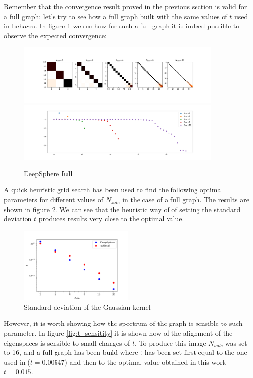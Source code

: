 Remember that the convergence result proved in the previous section is valid for a full graph: let's try to see how a full graph built with the same values of $t$ used in \cite{DeepSphere} behaves. 
In figure \ref{fig:DeepSphere_full} we see how for such a full graph it is indeed possible to observe the expected convergence:
\begin{figure}[h]
	\label{fig:DeepSphere_full}
	\caption{DeepSphere \textbf{full}}
	\centering
	\includegraphics[width=0.9\textwidth]{../codes/06_figures/deepsphere_full.png}
	\includegraphics[width=0.9\textwidth]{../codes/06_figures/deepsphere_full_diagonal.png}	
\end{figure}
A quick heuristic grid search has been used to find the following optimal parameters for different values of $N_{side}$ in the case of a full graph. The results are shown in figure \ref{fig:t}. We can see that the heuristic way of \cite{DeepSphere} of setting the standard deviation $t$ produces results very close to the optimal value.

\begin{figure}[h]
	\label{fig:t}
	\caption{Standard deviation of the Gaussian kernel}
	\centering
	\includegraphics[width=0.5\textwidth]{../codes/06_figures/kernelwidth.png}
\end{figure}

However, it is worth showing how the spectrum of the graph is sensible to such parameter. In figure \ref{fig:t_sensitity} it is shown how of the alignment of the eigenspaces is sensible to small changes of $t$. To produce this image $N_{side}$ was set to 16, and a full graph has been build where $t$ has been set first equal to the one used in \cite{DeepSphere} ($t=0.00647$) and then to the optimal value obtained in this work $t=0.015$.

